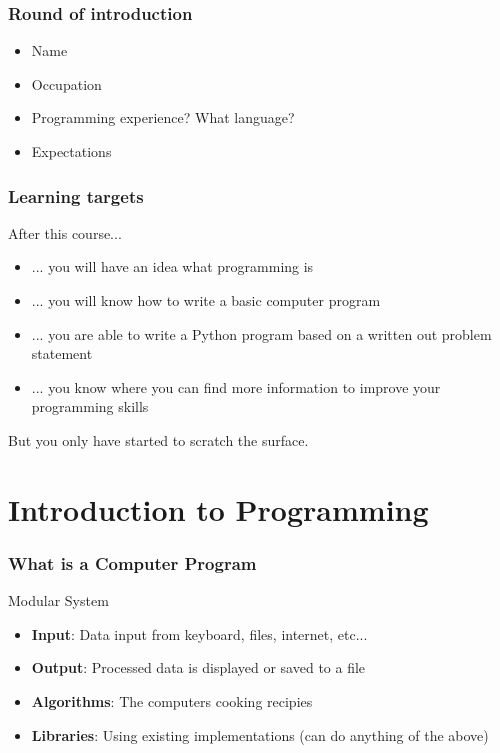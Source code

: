 \documentclass[10pt, a4paper]{beamer} %
\begin{document}
\begin{frame}[c]\frametitle{Round of introduction}
  \begin{itemize}
    \item Name
    \item Occupation
    \item Programming experience? What language?
    \item Expectations
  \end{itemize}
\end{frame}

\begin{frame}[c]\frametitle{Learning targets}

  After this course...
  \begin{itemize}
    \item ... you will have an idea what programming is
    \item ... you will know how to write a basic computer program
    \item ... you are able to write a Python program based on a written out
          problem statement
    \item ... you know where you can find more information to improve your
          programming skills
  \end{itemize}

  But you only have started to scratch the surface.
\end{frame}


\section{Introduction to Programming} %
\label{sec:introduction_to_programming}

\begin{frame}[c]\frametitle{What is a Computer Program}
  \begin{block}{Modular System}
    \begin{itemize}
      \item \textbf{Input}: Data input from keyboard, files, internet, etc...
      \item \textbf{Output}: Processed data is displayed or saved to a file
      \item \textbf{Algorithms}: The computers cooking recipies
      \item \textbf{Libraries}: Using existing implementations (can do anything of the above)
    \end{itemize}

  \end{block}
\end{frame}
\end{document}
